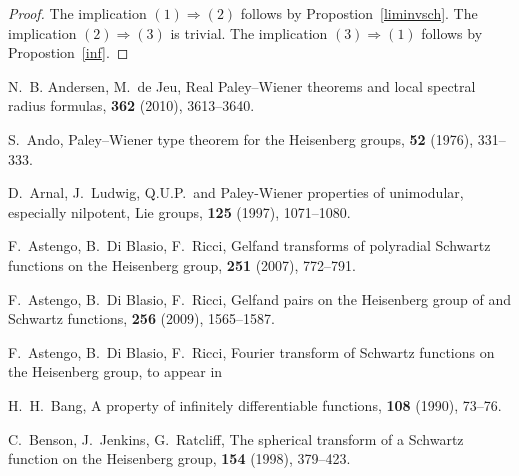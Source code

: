 \documentclass[12pt,a4paper]{amsart}
\theoremstyle{plain}
\theoremstyle{definition}
\numberwithin{equation}{section}
\begin{document}
\begin{proof} The implication $(1)\Rightarrow (2)$ follows by Propostion~\ref{liminvsch}. The implication
  $(2)\Rightarrow (3)$ is trivial. The implication $(3)\Rightarrow (1)$ follows by Propostion~\ref{inf}.   
  \end{proof}

\begin{thebibliography}{9999}

	{{\textrm{{N.~B. Andersen, M.~de Jeu,}}}}
	{{\textrm {{Real Paley--Wiener theorems and local spectral radius formulas}}}},
	{{\textit{}}}
    {{\textbf{{362}}}}
     (2010), 3613--3640.

	{{\textrm{{S.~Ando,}}}}
	{{\textrm {{Paley--Wiener type theorem for the Heisenberg groups}}}},
	{{\textit{}}}
	 {{\textbf{{52}}}}
	   (1976),  331--333.

	{{\textrm{{D.~Arnal, J.~Ludwig,}}}}
	{{\textrm {{Q.{U}.{P}.\ and {P}aley-{W}iener properties of unimodular,
              especially nilpotent, {L}ie groups}}}},
   {{\textit{}}}
   {{\textbf{{125}}}}
      (1997),  1071--1080.

	{{\textrm{{F.~Astengo, B.~Di Blasio, F.~Ricci,}}}}
	{{\textrm {{Gelfand transforms of polyradial Schwartz functions 
					on the Heisenberg group}}}},
	{{\textit{}}}
    {{\textbf{{251}}}}
     (2007), 772--791.

	{{\textrm{{F.~Astengo, B.~Di Blasio, F.~Ricci,}}}}
	{{\textrm {{Gelfand pairs  on the Heisenberg group of and Schwartz functions}}}},
	{{\textit{}}}
    {{\textbf{{256}}}}
     (2009), 1565--1587.

	{{\textrm{{F.~Astengo, B.~Di Blasio, F.~Ricci,}}}}
	{{\textrm {{Fourier transform of Schwartz functions on the Heisenberg group}}}},
	to appear in {{\textit{}}} 

	{{\textrm{{H.~H.~Bang,}}}}
	{{\textrm {{A property of infinitely differentiable functions}}}},
	{{\textit{}}}
	{{\textbf{{108}}}}
	(1990), 73--76.

    {{\textrm{{C.~Benson, J.~Jenkins, G.~Ratcliff,}}}}
    {{\textrm {{The spherical transform of a Schwartz function on the
Heisenberg
       group}}}},
    {{\textit{}}}
    {{\textbf{{154}}}}
     (1998), 379--423.


\end{thebibliography}
\end{document}

